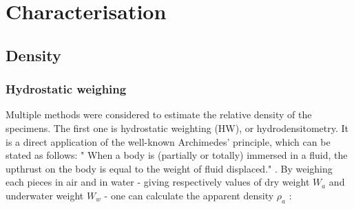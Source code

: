 \begin{center}
\begin{table}[ht]
\noindent{} 

\caption[List of the cubic heat-treated specimens]{List of the cubic heat-treated specimens}
\label{tab:RTT}
\end{table}
\end{center}


\section{Characterisation}

\subsection{Density}

\subsubsection{Hydrostatic weighing}

Multiple methods were considered to estimate the relative density of the specimens. The first one is hydrostatic weighting (HW), or hydrodensitometry. It is a direct application of the well-known Archimedes' principle, which can be stated as follows: " When a body is (partially or totally) immersed in a fluid, the upthrust on the body is equal to the weight of fluid displaced." \parencite{ADictionaryofPhysics}. By weighing each pieces in air and in water - giving respectively values of dry weight $W_a$ and underwater weight $W_w$ - one can calculate the apparent density $\rho_a$ \parencite{MethArch}:

